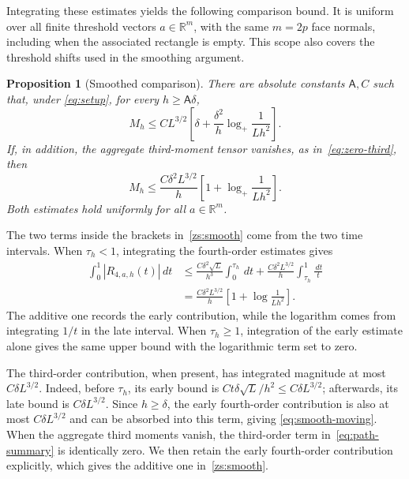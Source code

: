\documentclass[11pt,letterpaper]{article}
\newtheorem{proposition}{Proposition}
\theoremstyle{remark}
\newcommand{\R}{\mathbb R}
\newcommand{\dd}{\,d}
\begin{document}
Integrating these estimates yields the following comparison bound.
It is uniform over all finite threshold vectors \(a\in\R^m\),
with the same \(m=2p\) face normals, including when the associated
rectangle is empty. This scope also covers the threshold shifts
used in the smoothing argument.

\begin{proposition}[Smoothed comparison]\label{prop:moving-cutoff}
\label{zs:smooth-proposition}
There are absolute constants \(\mathsf A,C\) such that, under
\eqref{eq:setup}, for every \(h\ge\mathsf A\delta\),
\begin{equation}
 M_h\le CL^{3/2}\left[
 \delta+\frac{\delta^2}{h}\log_+\frac1{Lh^2}\right].
 \tag{S*}\label{eq:smooth-moving}
\end{equation}
If, in addition, the aggregate third-moment tensor vanishes,
as in~\eqref{eq:zero-third}, then
\begin{equation}
 M_h\le\frac{C\delta^2L^{3/2}}h
 \left[1+\log_+\frac1{Lh^2}\right].
 \label{zs:smooth}
\end{equation}
Both estimates hold uniformly for all \(a\in\R^m\).
\end{proposition}

The two terms inside the brackets in~\eqref{zs:smooth} come from the
two time intervals. When \(\tau_h<1\), integrating the fourth-order
estimates gives
\[
 \begin{aligned}
 \int_0^1|R_{4,a,h}(t)|\dd t
 &\le\frac{C\delta^2\sqrt L}{h^3}\int_0^{\tau_h}\dd t
    +\frac{C\delta^2L^{3/2}}h\int_{\tau_h}^1\frac{\dd t}{t}\\
 &=\frac{C\delta^2L^{3/2}}h
    \left[1+\log\frac1{Lh^2}\right].
 \end{aligned}
\]
The additive one records the early contribution, while the logarithm
comes from integrating \(1/t\) in the late interval. When
\(\tau_h\ge1\), integration of the early estimate alone gives the
same upper bound with the logarithmic term set to zero.

The third-order contribution, when present, has integrated magnitude
at most \(C\delta L^{3/2}\). Indeed, before \(\tau_h\), its early
bound is \(Ct\delta\sqrt L/h^2\le C\delta L^{3/2}\); afterwards,
its late bound is \(C\delta L^{3/2}\). Since \(h\ge\delta\), the
early fourth-order contribution is also at most
\(C\delta L^{3/2}\) and can be absorbed into this term, giving
\eqref{eq:smooth-moving}. When the aggregate third moments vanish,
the third-order term in~\eqref{eq:path-summary} is identically zero.
We then retain the early fourth-order contribution explicitly, which
gives the additive one in~\eqref{zs:smooth}.
\end{document}
